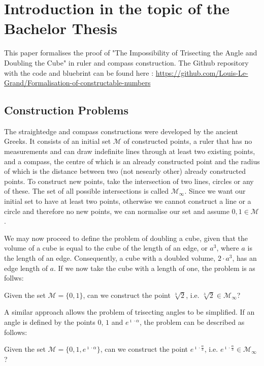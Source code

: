 \chapter[Introduction]{Introduction in the topic of the Bachelor Thesis}

This paper formalises the proof of "The Impossibility of Trisecting the Angle and Doubling the Cube" in ruler and compass construction. 
The Github repository with the code and bluebrint can be found here : \url{https://github.com/Louis-Le-Grand/Formalisation-of-constructable-numbers}
\section{Construction Problems}
The straightedge and compass constructions were developed by the ancient Greeks. 
It consists of an initial set $\mathcal{M}$ of constructed points, a ruler that has no measurements and can draw indefinite lines through at least two existing points,
and a compass, the centre of which is an already constructed point and the radius of which is the distance between two (not nesearly other) already constructed points. 
To construct new points, take the intersection of two lines, circles or any of these. The set of all possible intersections is called $\mathcal{M}_{\infty}$. 
Since we want our initial set to have at least two points, otherwise we cannot construct a line or a circle and therefore no new points, we can normalise our set and assume $0, 1 \in \mathcal{M}$.

We may now proceed to define the problem of doubling a cube, given that the volume of a cube is equal to the cube of the length of an edge, or $a^3$, where $a$ is the length of an edge.
Consequently, a cube with a doubled volume, $2\cdot a^3$, has an edge length of $a$.
If we now take the cube with a length of one, the problem is as follws:
\begin{problem}
    Given the set $\mathcal{M} = \{0, 1\}$, can we construct the point $\sqrt[3]{2}$, i.e. $\sqrt[3]{2} \in \mathcal{M}_{\infty}$?
\end{problem}

A similar approach allows the problem of trisecting angles to be simplified. 
If an angle is defined by the points $0$, $1$ and $e^{\imath\cdot\alpha}$, the problem can be described as follows:

\begin{problem}
    Given the set $\mathcal{M} = \{0, 1, e^{\imath\cdot\alpha}\}$, can we construct the point $e^{\imath\cdot\frac{\alpha}{3}}$, i.e. $e^{\imath\cdot\frac{\alpha}{3}} \in \mathcal{M}_{\infty}$?
\end{problem}

